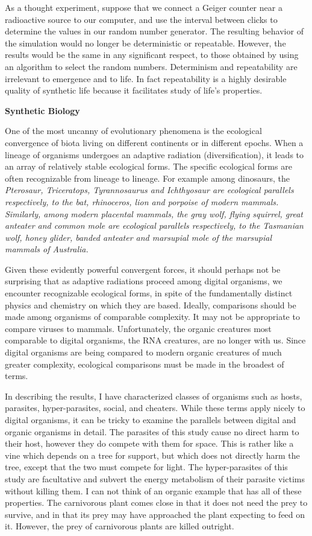As a thought experiment, suppose that we connect a Geiger counter near a
radioactive source to our computer, and use the interval between clicks
to determine the values in our random number generator.  The resulting behavior
of the simulation would no longer be deterministic or repeatable.  However,
the results would be the same in any significant respect, to those obtained
by using an algorithm to select the random numbers.  Determinism and
repeatability are irrelevant to emergence and to life.  In fact repeatability
is a highly desirable quality of synthetic life because it facilitates study
of life's properties.

\LP
\bf Synthetic Biology\rm
\eLP

One of the most uncanny of evolutionary phenomena is the ecological convergence
of biota living on different continents or in different epochs.  When a
lineage of organisms undergoes an adaptive radiation (diversification),
it leads to an array of relatively stable ecological forms.  The specific
ecological forms are often recognizable from lineage to lineage.  For example
among dinosaurs, the \it Pterosaur\rm, \it Triceratops\rm,
\it Tyrannosaurus \rm and \it Ichthyosaur \rm
are ecological parallels respectively, to the bat, rhinoceros, lion and
porpoise of modern mammals.  Similarly, among modern placental mammals, the
gray wolf, flying squirrel, great anteater and common mole are ecological
parallels respectively, to the Tasmanian wolf, honey glider, banded anteater
and marsupial mole of the marsupial mammals of Australia.

Given these evidently powerful convergent forces, it should perhaps not be
surprising that as adaptive radiations proceed among digital organisms, we
encounter recognizable ecological forms, in spite of the fundamentally
distinct physics and chemistry on which they are based.  Ideally, comparisons
should be made among organisms of comparable complexity.  It may not be
appropriate to compare viruses to mammals.  Unfortunately, the organic
creatures most comparable to digital organisms, the RNA creatures, are no
longer with us.  Since digital organisms are being compared to modern organic
creatures of much greater complexity, ecological comparisons must be made in
the broadest of terms.

In describing the results, I have characterized classes of organisms such as
hosts, parasites, hyper-parasites, social, and cheaters.  While these terms
apply nicely to digital organisms, it can be tricky to examine the parallels
between digital and organic organisms in detail.  The parasites of this study
cause no direct harm to their host, however they do compete with them for
space.  This is rather like a vine which depends on a tree for support, but
which does not directly harm the tree, except that the two must compete for
light.  The hyper-parasites of this study are facultative and subvert the
energy metabolism of their parasite victims without killing them.  I can not
think of an organic example that has all of these properties.  The carnivorous
plant comes close in that it does not need the prey to survive, and in that
its prey may have approached the plant expecting to feed on it.  However, the
prey of carnivorous plants are killed outright.


